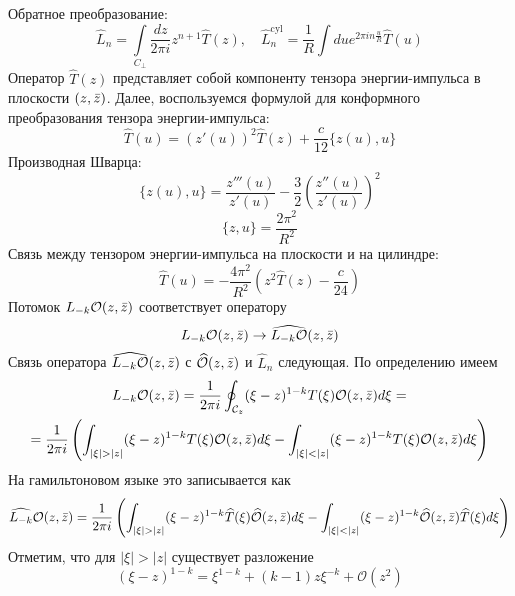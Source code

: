 \documentclass[12pt]{article}
\theoremstyle{definition}
\begin{document}
Обратное преобразование:
\begin{equation}
    \widehat{L}_n=\int\limits_{C_\perp}\frac{dz}{2\pi i}z^{n+1}\widehat{T}(z),\quad \widehat{L}^{\text{cyl}}_n=\frac{1}{R}\int due^{2\pi in\frac{u}{R}}\widehat{T}(u)
\end{equation}
Оператор $\widehat{T}(z)$ представляет собой компоненту тензора энергии-импульса в плоскости $(z,\Bar{z})$. Далее, воспользуемся формулой для конформного преобразования тензора
энергии-импульса:
\begin{equation}
    \widehat{T}(u)=(z'(u))^2\widehat{T}(z)+\frac{c}{12}\{z(u),u\}
\end{equation}
Производная Шварца:
\begin{equation}
    \{z(u),u\}=\frac{z'''(u)}{z'(u)}-\frac{3}{2}\left(\frac{z''(u)}{z'(u)}\right)^2
\end{equation}
\begin{equation}
    \{z,u\}=\frac{2\pi^2}{R^2}
\end{equation}
Связь между тензором энергии-импульса на плоскости и на цилиндре:
\begin{equation}
    \widehat{T}(u)=-\frac{4\pi^2}{R^2}\left(z^2\widehat{T}(z)-\frac{c}{24}\right)
\end{equation}
Потомок $L_{-k}\mathcal{O}(z,\Bar{z})$ соответствует оператору
\begin{equation}
    L_{-k}\mathcal{O}(z,\Bar{z})\rightarrow\widehat{L_{-k}\mathcal{O}}(z,\Bar{z})
\end{equation}
Связь оператора $\widehat{L_{-k}\mathcal{O}}(z,\Bar{z})$ с $\widehat{\mathcal{O}}(z,\Bar{z})$ и $\widehat{L}_n$ следующая. По определению имеем
\begin{multline}
    L_{-k}\mathcal{O}(z,\Bar{z})=\frac{1}{2\pi i}\oint_{\mathcal{C}_z}(\xi-z)^{1-k}T(\xi)\mathcal{O}(z,\Bar{z})d\xi=\\=\frac{1}{2\pi i}\left(\int_{|\xi|>|z|}(\xi-z)^{1-k}T(\xi)\mathcal{O}(z,\Bar{z})d\xi-\int_{|\xi|<|z|}(\xi-z)^{1-k}T(\xi)\mathcal{O}(z,\Bar{z})d\xi\right)
\end{multline}
На гамильтоновом языке это записывается как
\begin{equation}
    \widehat{L_{-k}}\mathcal{O}(z,\Bar{z})=\frac{1}{2\pi i}\left(\int_{|\xi|>|z|}(\xi-z)^{1-k}\widehat{T}(\xi)\widehat{\mathcal{O}}(z,\Bar{z})d\xi-\int_{|\xi|<|z|}(\xi-z)^{1-k}\widehat{\mathcal{O}}(z,\Bar{z})\widehat{T}(\xi)d\xi\right)
\end{equation}
Отметим, что для $|\xi|>|z|$ существует разложение
\begin{equation}
    (\xi-z)^{1-k}=\xi^{1-k}+(k-1)z\xi^{-k}+\mathcal{O}(z^2)
\end{equation}
\end{document}
